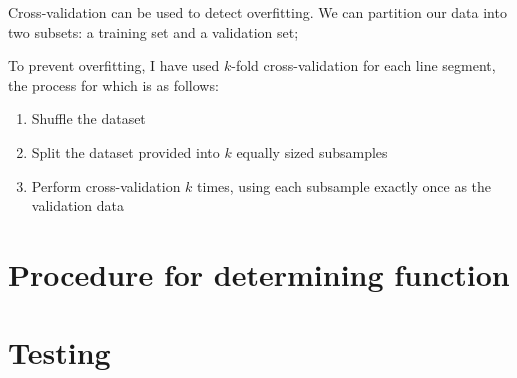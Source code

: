 \documentclass[onecolumn, 12pt, a4paper]{article}
\begin{document}
Cross-validation can be used to detect overfitting. We can partition
our data into two subsets: a training set and a validation set;


To prevent overfitting, I have used $k$-fold cross-validation
for each line segment, the process for which is as follows:

\begin{enumerate}
    \item Shuffle the dataset
    \item Split the dataset provided into $k$ equally sized subsamples
    \item Perform cross-validation $k$ times, using each subsample exactly once as the validation data
\end{enumerate}

\section{Procedure for determining function}

\section{Testing}
\end{document}
